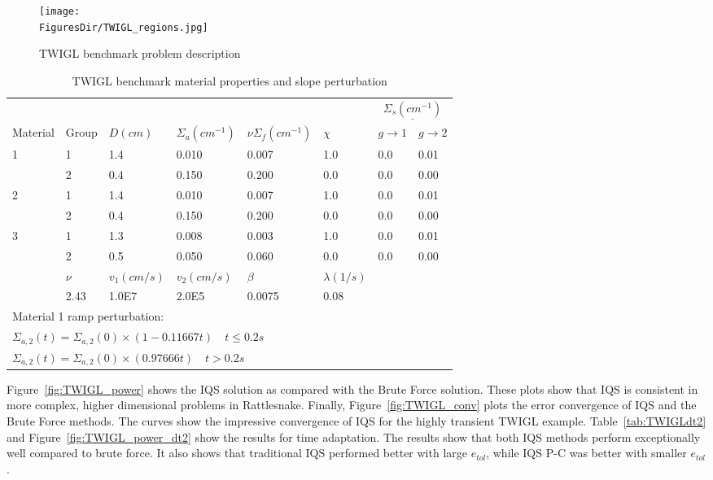 \documentclass[12pt]{scrartcl}
\newcommand{\fig}[1]{Figure~\ref{#1}}                      %
\newcommand{\tbl}[1]{Table~\ref{#1}}                     %
\newcommand{\FiguresDir}{./figs}
\begin{document}
\begin{figure}[!htbp]
\begin{center}
\texttt{[image: \\FiguresDir/TWIGL\_regions.jpg]}
\caption{TWIGL benchmark problem description}
\label{fig:TWIGL_reg}
\end{center}
\end{figure}

\begin{table}[!htbp]
\begin{center}
\caption{TWIGL benchmark material properties and slope perturbation}
\label{tab:TWIGL_mat}
\begin{tabular}{llllllll}
\hline
  &  &  &  &  &  &  \multicolumn{2}{c}{$\underline{\Sigma_s (cm^{-1})} $} \\
Material & Group & $D (cm)$ & $\Sigma_a (cm^{-1})$ & $\nu\Sigma_f (cm^{-1})$ & $\chi$ & $g \rightarrow 1$ & $g \rightarrow 2$ \\
\hline
1 & 1 & 1.4 & 0.010 & 0.007 & 1.0 & 0.0 & 0.01 \\
  & 2 & 0.4 & 0.150 & 0.200 & 0.0 & 0.0 & 0.00  \\
2 & 1 & 1.4 & 0.010 & 0.007 & 1.0 & 0.0 & 0.01  \\
  & 2 & 0.4 & 0.150 & 0.200 & 0.0 & 0.0 & 0.00  \\
3 & 1 & 1.3 & 0.008 & 0.003 & 1.0 & 0.0 & 0.01  \\
  & 2 & 0.5 & 0.050 & 0.060 & 0.0 & 0.0 & 0.00  \\
\hline
  & $\nu$ & $v_1 (cm/s)$ & $v_2 (cm/s)$ & $\beta$ & $\lambda (1/s)$ &   &   \\
\hline
  & 2.43 & 1.0E7 & 2.0E5 & 0.0075 & 0.08 &   &   \\
\hline
 \multicolumn{8}{l}{\footnotesize Material 1 ramp perturbation:} \\
\multicolumn{8}{l}{\footnotesize $\Sigma_{a,2}(t)=\Sigma_{a,2}(0) \times (1-0.11667t) \quad t \leq 0.2 s$} \\
\multicolumn{8}{l}{\footnotesize $\Sigma_{a,2}(t)=\Sigma_{a,2}(0) \times (0.97666t) \quad t > 0.2 s$} \normalsize
\end{tabular}
\end{center}
\end{table}

\fig{fig:TWIGL_power} shows the IQS  solution as compared with the Brute Force solution.  These plots show that IQS is consistent in more complex, higher dimensional problems in Rattlesnake.  Finally, \fig{fig:TWIGL_conv} plots the error convergence of IQS and the Brute Force methods.  The curves show the impressive convergence of IQS for the highly transient TWIGL example.  \tbl{tab:TWIGLdt2} and \fig{fig:TWIGL_power_dt2} show the results for time adaptation.  The results show that both IQS methods perform exceptionally well compared to brute force.  It also shows that traditional IQS performed better with large $e_{tol}$, while IQS P-C was better with smaller $e_{tol}$.
\end{document}
